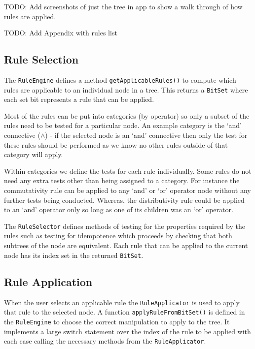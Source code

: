 \documentclass{report}
\begin{document}
TODO: Add screenshots of just the tree in app to show a walk through of how rules are applied.

TODO: Add Appendix with rules list

\subsection{Rule Selection}
\label{sub:rule_selection}

The {\tt RuleEngine} defines a method {\tt getApplicableRules()} to compute which rules are applicable to an individual node in a tree. This returns a {\tt BitSet} where each set bit represents a rule that can be applied.

Most of the rules can be put into categories (by operator) so only a subset of the rules need to be tested for a particular node. An example category is the `and' connective ($\land$) - if the selected node is an `and' connective then only the test for these rules should be performed as we know no other rules outside of that category will apply.

Within categories we define the tests for each rule individually. Some rules do not need any extra tests other than being assigned to a category. For instance the commutativity rule can be applied to any `and' or `or' operator node without any further tests being conducted. Whereas, the distributivity rule could be applied to an `and' operator only so long as one of its children was an `or' operator.

The {\tt RuleSelector} defines methods of testing for the properties required by the rules such as testing for idempotence which proceeds by checking that both subtrees of the node are equivalent. Each rule that can be applied to the current node has its index set in the returned {\tt BitSet}.

\subsection{Rule Application}
\label{sub:rule_application}

When the user selects an applicable rule the {\tt RuleApplicator} is used to apply that rule to the selected node. A function {\tt applyRuleFromBitSet()} is defined in the {\tt RuleEngine} to choose the correct manipulation to apply to the tree. It implements a large switch statement over the index of the rule to be applied with each case calling the necessary methods from the {\tt RuleApplicator}.
\end{document}

